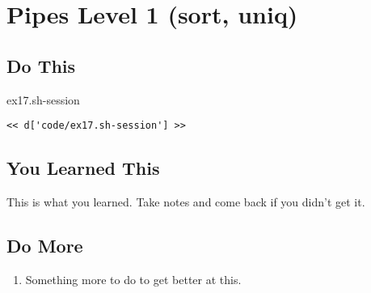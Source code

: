 \chapter{Pipes Level 1 (sort, uniq)}

\section{Do This}

\begin{code}{ex17.sh-session}
\begin{Verbatim}
<< d['code/ex17.sh-session'] >>
\end{Verbatim}
\end{code}


\section{You Learned This}

This is what you learned.  Take notes and come back if you didn't get it.

\section{Do More}

\begin{enumerate}
\item Something more to do to get better at this.
\end{enumerate}

